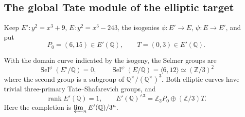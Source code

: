 \subsection{The global Tate module of the elliptic target}
\label{sec:ghost-elliptic-arithmetic}

Keep \(E':y^2=x^3+9\), \(E:y^2=x^3-243\),
the isogenies \(\phi:E'\to E\), \(\psi:E\to E'\),
and put
\[
                  P_0=(6,15)\in E'(\mathbb Q),
                  \qquad T=(0,3)\in E'(\mathbb Q).
\]

\begin{proposition}
\label{prop:ghost-elliptic-selmer}
With the domain curve indicated by the isogeny, the
Selmer groups are
\[
 \operatorname{Sel}^{\phi}(E'/\mathbb Q)=0,
 \qquad
 \operatorname{Sel}^{\psi}(E/\mathbb Q)
      =\langle6,12\rangle\simeq(\mathbb Z/3)^2
\]
where the second group is a subgroup of
\(\mathbb Q^\times/(\mathbb Q^\times)^3\).
Both elliptic curves
have trivial three-primary Tate--Shafarevich groups,
and
\[
 \operatorname{rank} E'(\mathbb Q)=1,
 \qquad E'(\mathbb Q)^{\wedge3}
          =\mathbb Z_3 P_0\oplus(\mathbb Z/3)T.
\]
Here the completion is \(\varprojlim_n E'(\mathbb Q)/3^n\).
\end{proposition}

